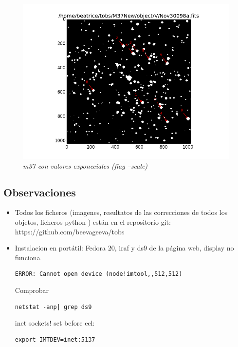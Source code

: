 \documentclass{article}
\begin{document}
\begin{figure}[!ht]
 \centering
 \includegraphics[scale=0.7]{cum.png}
 \caption{\emph{m37 con valores exponeciales (flag --scale)}}
\end{figure}





\subsection*{Observaciones}
\begin{itemize}

\item Todos los ficheros (imagenes, resultatos de las correcciones de todos los objetos, ficheros python ) están en el repositorio git:
https://github.com/beevageeva/tobs

\item Instalacion en portátil: Fedora 20, iraf y ds9 de la página web, display no funciona

\begin{verbatim}
ERROR: Cannot open device (node!imtool,,512,512)
\end{verbatim}
Comprobar 
\begin{verbatim}
netstat -anp| grep ds9
\end{verbatim}
inet sockets! set before ecl:
\begin{verbatim}
export IMTDEV=inet:5137
\end{verbatim}


\end{itemize}
\end{document}
